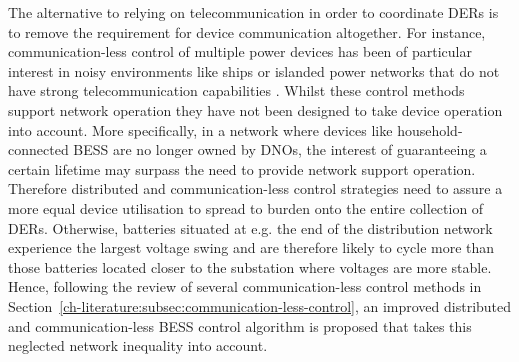 The alternative to relying on telecommunication in order to coordinate DERs is to remove the requirement for device communication altogether.
For instance, communication-less control of multiple power devices has been of particular interest in noisy environments like ships \cite{Baldwin2004} or islanded power networks that do not have strong telecommunication capabilities \cite{Diaz2017}.
Whilst these control methods support network operation they have not been designed to take device operation into account.
More specifically, in a network where devices like household-connected BESS are no longer owned by DNOs, the interest of guaranteeing a certain lifetime may surpass the need to provide network support operation.
Therefore distributed and communication-less control strategies need to assure a more equal device utilisation to spread to burden onto the entire collection of DERs.
Otherwise, batteries situated at e.g. the end of the distribution network experience the largest voltage swing and are therefore likely to cycle more than those batteries located closer to the substation where voltages are more stable.
Hence, following the review of several communication-less control methods in Section~\ref{ch-literature:subsec:communication-less-control}, an improved distributed and communication-less BESS control algorithm is proposed that takes this neglected network inequality into account.
